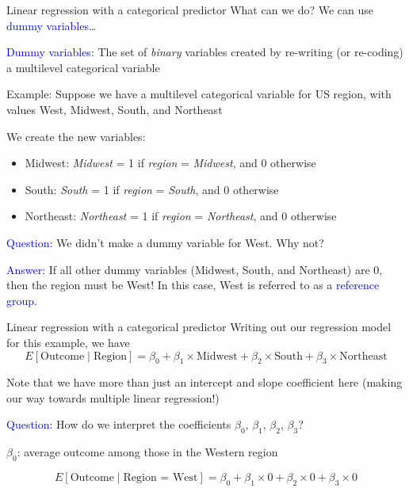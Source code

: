 \documentclass[10pt,t]{beamer}
\begin{document}
\begin{frame}{Linear regression with a categorical predictor}
What can we do? We can use \textcolor{blue}{dummy variables}\dots

\vspace{0.3cm}

\textcolor{blue}{Dummy variables}: The set of \textit{binary} variables created by re-writing (or re-coding) a multilevel categorical variable  

\vspace{0.3cm}

Example: Suppose we have a multilevel categorical variable for US region, with values West, Midwest, South, and Northeast

\vspace{0.3cm}

We create the new variables:
\begin{itemize}
	\item Midwest: \textit{Midwest} = 1 if \textit{region} = \textit{Midwest}, and 0 otherwise
	\item South: \textit{South} = 1 if \textit{region} = \textit{South}, and 0 otherwise
	\item Northeast: \textit{Northeast} = 1 if \textit{region} = \textit{Northeast}, and 0 otherwise
\end{itemize} \pause

\vspace{0.1cm}

\textcolor{blue}{Question:} We didn't make a dummy variable for West. Why not? \pause

\textcolor{blue}{Answer:} If all other dummy variables (Midwest, South, and Northeast) are 0, then the region must be West! In this case, West is referred to as a \textcolor{blue}{reference group}.
\end{frame} 

\begin{frame}{Linear regression with a categorical predictor}
Writing out our regression model for this example, we have
$$
E[\text{Outcome} \mid \text{Region}] = \beta_0 + \beta_1 \times \text{Midwest} + \beta_2 \times \text{South} + \beta_3 \times \text{Northeast}
$$

Note that we have more than just an intercept and slope coefficient here (making our way towards multiple linear regression!)

\vspace{0.3cm}

\textcolor{blue}{Question}: How do we interpret the coefficients $\beta_0$, $\beta_1$, $\beta_2$, $\beta_3$? \pause

\vspace{0.3cm}

$\beta_0$: average outcome among those in the Western region

$$
E[\text{Outcome} \mid \text{Region = West}] = \beta_0 + \beta_1 \times 0 + \beta_2 \times 0 + \beta_3 \times 0
$$


\end{frame}
\end{document}
